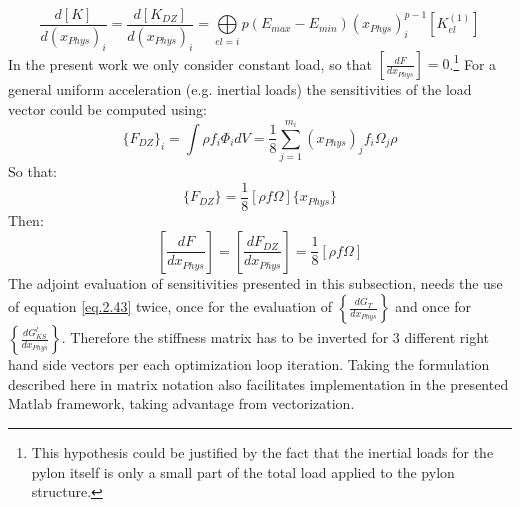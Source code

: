   \begin{equation}
  \frac{d\left[K\right]}{d(x_{Phys})_i}=\frac{d\left[K_{DZ}\right]}{d(x_{Phys})_i}=\underset{el=i}{\bigoplus}{p(E_{max}-E_{min})(x_{Phys})_i^{p-1}\left[K_{el}^{(1)}\right]}
  \end{equation}
 In the present work we only consider constant load, so that $\left[\frac{dF}{dx_{Phys}}\right]=0$.\footnote{This hypothesis could be justified by the fact that the inertial loads for the pylon itself is only a small part of the total load applied to the pylon structure.}
 For a general uniform acceleration (e.g. inertial loads) the sensitivities of the load vector could be computed using:
 \begin{equation}
 \lbrace F_{DZ} \rbrace_i = \int \rho  f_i  \Phi_i dV=\frac{1}{8}\sum\limits_{j=1}^{m_i}(x_{Phys})_jf_i\Omega_j\rho
 \end{equation}
 So that:
 \begin{equation}
 \lbrace F_{DZ}\rbrace=\frac{1}{8}\left[\rho f\Omega \right]\lbrace x_{Phys} \rbrace
 \end{equation}
 Then:
 \begin{equation}
 \left[\frac{dF}{dx_{Phys}}\right]=\left[\frac{dF_{DZ}}{dx_{Phys}}\right]=\frac{1}{8}\left[\rho f \Omega\right]
 \end{equation}
   The adjoint evaluation of sensitivities presented in this subsection, needs the use of equation \eqref{eq.2.43} twice, once for the evaluation of $\left\lbrace\frac{d G_T}{dx_{Phys}}\right\rbrace$ and once for $\left\lbrace\frac{d G_{KS}^l}{dx_{Phys}}\right\rbrace$.
   Therefore the stiffness matrix has to be inverted for 3 different right hand side vectors per each optimization loop iteration. Taking the formulation described here in matrix notation also facilitates implementation in the presented Matlab framework, taking advantage from vectorization.
